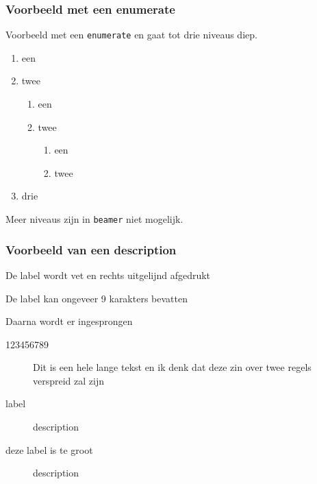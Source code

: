 \documentclass[fleqn,aspectratio=169,dutch,10pt]{beamer}
\begin{document}
\begin{frame}
\frametitle{Voorbeeld met een enumerate}
Voorbeeld met een \texttt{enumerate} en gaat tot drie niveaus diep.
\begin{enumerate}
\item een
\item twee
\begin{enumerate}
\item een
\item twee
\begin{enumerate}
\item een
\item twee
\end{enumerate}
\end{enumerate}
\item drie
\end{enumerate}
Meer niveaus zijn in \lstinline|beamer| niet mogelijk.
\end{frame}


\begin{frame}
\frametitle{Voorbeeld van een description}
De label wordt vet en rechts uitgelijnd afgedrukt

De label kan ongeveer 9 karakters bevatten

Daarna wordt er ingesprongen
\begin{description}
\item[123456789] Dit is een hele lange tekst en ik denk dat deze zin over twee regels verspreid zal zijn
\item[label] description
\item[deze label is te groot] description
\end{description}
\end{frame}
\end{document}
